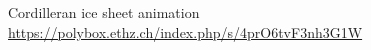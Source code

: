 
    \begin{frame}{}
      \centering
      Cordilleran ice sheet animation\\
      \bigskip
      \url{https://polybox.ethz.ch/index.php/s/4prO6tvF3nh3G1W}\\
    \end{frame}

